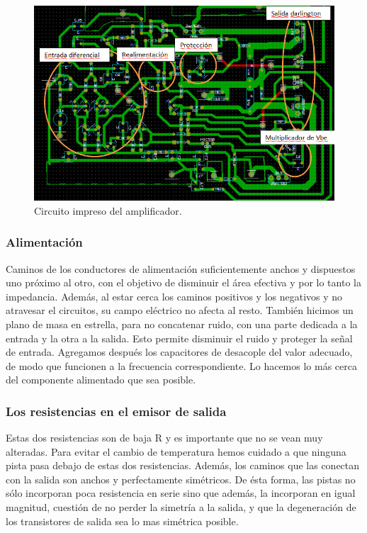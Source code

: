 \begin{figure}[H]
\centering
\includegraphics[scale=0.8]{img/eschema2.png}
\caption{Circuito impreso del amplificador.}
\end{figure}

\subsubsection*{Alimentación}
Caminos de los conductores de alimentación suficientemente anchos y  dispuestos uno próximo al otro, con el objetivo de disminuir el área efectiva y por lo tanto la impedancia. Además, al estar cerca los caminos positivos y los negativos y no atravesar el circuitos, su campo eléctrico no afecta al resto.
También hicimos un plano de masa en estrella, para no concatenar ruido, con una parte dedicada a la entrada y la otra a la salida. Esto permite disminuir el ruido y proteger la señal de entrada.
 Agregamos después los capacitores de desacople del valor adecuado, de modo que funcionen a la frecuencia correspondiente. Lo hacemos lo más cerca del componente alimentado que sea posible.

\subsubsection*{Los resistencias en el emisor de salida}
Estas dos resistencias son de baja R y es importante que no se vean muy alteradas. Para evitar el cambio de temperatura hemos cuidado a que ninguna pista pasa debajo de estas dos resistencias. Además, los caminos que las conectan con la salida son anchos y perfectamente simétricos. De ésta forma, las pistas no sólo incorporan poca resistencia en serie sino que además, la incorporan en igual magnitud, cuestión de no perder la simetría a la salida, y que la degeneración de los transistores de salida sea lo mas simétrica posible.

